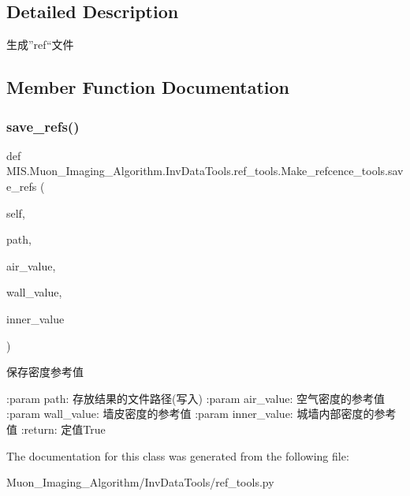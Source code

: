 \subsection{Detailed Description}
\begin{DoxyVerb}生成”ref“文件\end{DoxyVerb}
 

\subsection{Member Function Documentation}
\mbox{\label{classMIS_1_1Muon__Imaging__Algorithm_1_1InvDataTools_1_1ref__tools_1_1Make__refcence__tools_a31d6684a74cc5a456dc109a2b04edf0a}} 
\subsubsection{\texorpdfstring{save\+\_\+refs()}{save\_refs()}}
{\footnotesize\ttfamily def M\+I\+S.\+Muon\+\_\+\+Imaging\+\_\+\+Algorithm.\+Inv\+Data\+Tools.\+ref\+\_\+tools.\+Make\+\_\+refcence\+\_\+tools.\+save\+\_\+refs (\begin{DoxyParamCaption}\item[{}]{self,  }\item[{}]{path,  }\item[{}]{air\+\_\+value,  }\item[{}]{wall\+\_\+value,  }\item[{}]{inner\+\_\+value }\end{DoxyParamCaption})}

\begin{DoxyVerb}保存密度参考值

:param path: 存放结果的文件路径(写入)
:param air_value: 空气密度的参考值
:param wall_value: 墙皮密度的参考值
:param inner_value: 城墙内部密度的参考值
:return: 定值True
\end{DoxyVerb}
 

The documentation for this class was generated from the following file\+:\begin{DoxyCompactItemize}
\item 
Muon\+\_\+\+Imaging\+\_\+\+Algorithm/\+Inv\+Data\+Tools/ref\+\_\+tools.\+py\end{DoxyCompactItemize}
